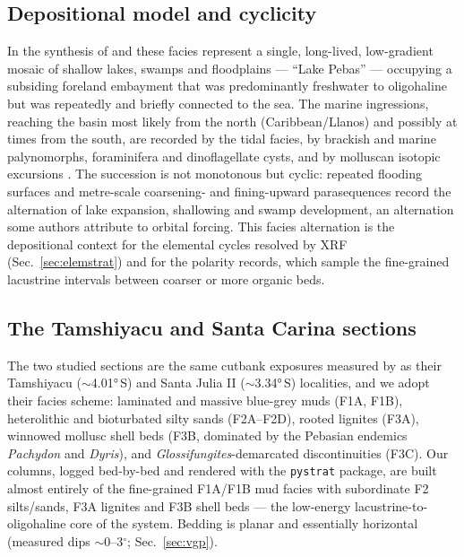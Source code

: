 \documentclass[11pt]{article}
\begin{document}
\subsection{Depositional model and cyclicity}
In the synthesis of \citet{Hoorn2010} and \citet{Wesselingh2002} these facies
represent a single, long-lived, low-gradient mosaic of shallow lakes, swamps and
floodplains --- ``Lake Pebas'' --- occupying a subsiding foreland embayment that
was predominantly freshwater to oligohaline but was repeatedly and briefly
connected to the sea. The marine ingressions, reaching the basin most likely from
the north (Caribbean/Llanos) and possibly at times from the south, are recorded
by the tidal facies, by brackish and marine palynomorphs, foraminifera and
dinoflagellate cysts, and by molluscan isotopic excursions
\citep{Hoorn1993,Hoorn1994,Wesselingh2006}. The succession is not monotonous but
cyclic: repeated flooding surfaces and metre-scale coarsening- and
fining-upward parasequences record the alternation of lake expansion,
shallowing and swamp development, an alternation some authors attribute to
orbital forcing. This facies alternation is the depositional context for the
elemental cycles resolved by XRF (Sec.~\ref{sec:elemstrat}) and for the polarity
records, which sample the fine-grained lacustrine intervals between coarser or
more organic beds.

\subsection{The Tamshiyacu and Santa Carina sections}
The two studied sections are the same cutbank exposures measured by
\citet{Gingras2002} as their Tamshiyacu ($\sim$\ang{4.01}\,S) and Santa Julia II
($\sim$\ang{3.34}\,S) localities, and we adopt their facies scheme: laminated and
massive blue-grey muds (F1A, F1B), heterolithic and bioturbated silty sands
(F2A--F2D), rooted lignites (F3A), winnowed mollusc shell beds (F3B, dominated by
the Pebasian endemics \textit{Pachydon} and \textit{Dyris}), and
\textit{Glossifungites}-demarcated discontinuities (F3C). Our columns, logged
bed-by-bed and rendered with the \texttt{pystrat} package, are built almost
entirely of the fine-grained F1A/F1B mud facies with subordinate F2 silts/sands,
F3A lignites and F3B shell beds --- the low-energy lacustrine-to-oligohaline core
of the system. Bedding is planar and essentially horizontal (measured dips
$\sim$0--3$^\circ$; Sec.~\ref{sec:vgp}).
\end{document}
